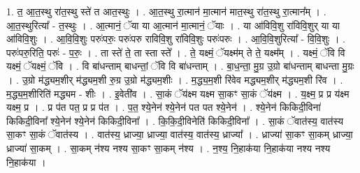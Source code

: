 \documentclass[17pt]{extarticle}
\begin{document}
1. त॒ आ॒त॒स्थु रा॑त॒स्थु स्ते॑ त आत॒स्थुः । . आ॒त॒स्थु रा॒त्मान॑ मा॒त्मान॑ मात॒स्थु रा॑त॒स्थु रा॒त्मान᳚म् । . आ॒त॒स्थुरित्या᳚ - त॒स्थुः । . आ॒त्मानं॒ ॅया या आ॒त्मान॑ मा॒त्मानं॒ ॅयाः । . या आ॑विवि॒शु रा॑विवि॒शुर् या या आ॑विवि॒शुः । . आ॒वि॒वि॒शुः परुः॑परुः॒ परुः॑परु राविवि॒शु रा॑विवि॒शुः परुः॑परुः । . आ॒वि॒वि॒शुरित्या᳚ - वि॒वि॒शुः । . परुः॑परु॒रिति॒ परुः॑ - प॒रुः॒ । . ता स्ते॑ ते॒ ता स्ता स्ते᳚ । . ते॒ यक्ष्मं॒ ॅयक्ष्म॑म् ते ते॒ यक्ष्म᳚म् । . यक्ष्मं॒ ॅवि वि यक्ष्मं॒ ॅयक्ष्मं॒ ॅवि । . वि बा॑धन्ताम् बाधन्तां॒ ॅवि वि बा॑धन्ताम् । . बा॒ध॒न्ता॒ मु॒ग्र उ॒ग्रो बा॑धन्ताम् बाधन्ता मु॒ग्रः । . उ॒ग्रो म॑द्ध्यम॒शीर् म॑द्ध्यम॒शी रु॒ग्र उ॒ग्रो म॑द्ध्यम॒शीः । . म॒द्ध्य॒म॒शी रि॑वेव मद्ध्यम॒शीर् म॑द्ध्यम॒शी रि॑व । . म॒द्ध्य॒म॒शीरिति॑ मद्ध्यम - शीः । . इ॒वेती॑व । . सा॒कं ॅय॑क्ष्म यक्ष्म सा॒कꣳ सा॒कं ॅय॑क्ष्म । . य॒क्ष्म॒ प्र प्र य॑क्ष्म यक्ष्म॒ प्र । . प्र प॑त पत॒ प्र प्र प॑त । . प॒त॒ श्ये॒नेन॑ श्ये॒नेन॑ पत पत श्ये॒नेन॑ । . श्ये॒नेन॑ किकिदी॒विना॑ किकिदी॒विना᳚ श्ये॒नेन॑ श्ये॒नेन॑ किकिदी॒विना᳚ । . कि॒कि॒दी॒विनेति॑ किकिदी॒विना᳚ । . सा॒कं ॅवात॑स्य॒ वात॑स्य सा॒कꣳ सा॒कं ॅवात॑स्य । . वात॑स्य॒ ध्राज्या॒ ध्राज्या॒ वात॑स्य॒ वात॑स्य॒ ध्राज्या᳚ । . ध्राज्या॑ सा॒कꣳ सा॒कम् ध्राज्या॒ ध्राज्या॑ सा॒कम् । . सा॒कम् न॑श्य नश्य सा॒कꣳ सा॒कम् न॑श्य । . न॒श्य॒ नि॒हाक॑या नि॒हाक॑या नश्य नश्य नि॒हाक॑या । \newline
\end{document}
